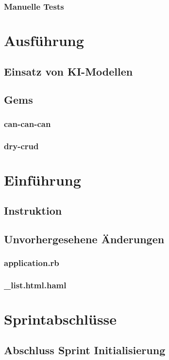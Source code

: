 \subsection{Manuelle Tests}

\chapter{Ausführung}
\section{Einsatz von KI-Modellen}
\section{Gems}
\subsection{can-can-can}
\subsection{dry-crud}

\chapter{Einführung}
\section{Instruktion}

\section{Unvorhergesehene Änderungen}
\subsection{application.rb}
\subsection{\_list.html.haml}

\chapter{Sprintabschlüsse}

\section{Abschluss Sprint Initialisierung}
